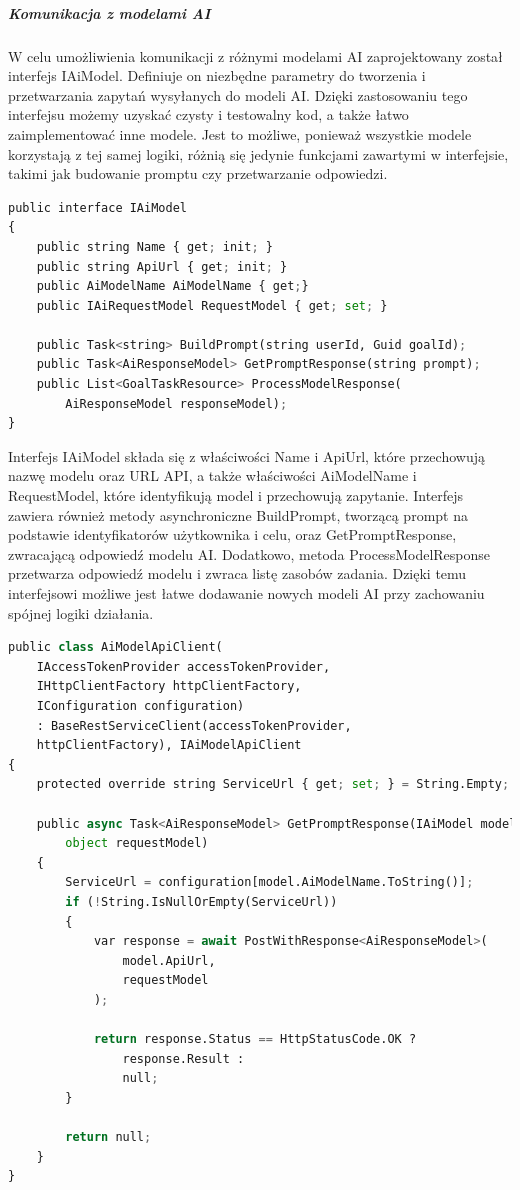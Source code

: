 \subparagraph{Komunikacja z modelami AI}
W celu umożliwienia komunikacji z różnymi modelami AI zaprojektowany został interfejs IAiModel. Definiuje on niezbędne parametry do tworzenia i przetwarzania zapytań wysyłanych do modeli AI. Dzięki zastosowaniu tego interfejsu możemy uzyskać czysty i testowalny kod, a także łatwo zaimplementować inne modele. Jest to możliwe, ponieważ wszystkie modele korzystają z tej samej logiki, różnią się jedynie funkcjami zawartymi w interfejsie, takimi jak budowanie promptu czy przetwarzanie odpowiedzi.
\begin{lstlisting}[language=Python, caption=Inerfejs IAiModel, linewidth=160mm]
public interface IAiModel
{
    public string Name { get; init; }
    public string ApiUrl { get; init; }
    public AiModelName AiModelName { get;}
    public IAiRequestModel RequestModel { get; set; }

    public Task<string> BuildPrompt(string userId, Guid goalId);
    public Task<AiResponseModel> GetPromptResponse(string prompt);
    public List<GoalTaskResource> ProcessModelResponse(
        AiResponseModel responseModel);
}
\end{lstlisting}
Interfejs IAiModel składa się z właściwości Name i ApiUrl, które przechowują nazwę modelu oraz URL API, a także właściwości AiModelName i RequestModel, które identyfikują model i przechowują zapytanie. Interfejs zawiera również metody asynchroniczne BuildPrompt, tworzącą prompt na podstawie identyfikatorów użytkownika i celu, oraz GetPromptResponse, zwracającą odpowiedź modelu AI. Dodatkowo, metoda ProcessModelResponse przetwarza odpowiedź modelu i zwraca listę zasobów zadania. Dzięki temu interfejsowi możliwe jest łatwe dodawanie nowych modeli AI przy zachowaniu spójnej logiki działania.
\begin{lstlisting}[language=Python, caption=Komunikacja z modelem AI przy użyciu klienta RESTowego, linewidth=160mm]
public class AiModelApiClient(
    IAccessTokenProvider accessTokenProvider,
    IHttpClientFactory httpClientFactory,
    IConfiguration configuration)
    : BaseRestServiceClient(accessTokenProvider, 
    httpClientFactory), IAiModelApiClient
{
    protected override string ServiceUrl { get; set; } = String.Empty;

    public async Task<AiResponseModel> GetPromptResponse(IAiModel model, 
        object requestModel)
    {
        ServiceUrl = configuration[model.AiModelName.ToString()];
        if (!String.IsNullOrEmpty(ServiceUrl))
        {
            var response = await PostWithResponse<AiResponseModel>(
                model.ApiUrl, 
                requestModel
            );

            return response.Status == HttpStatusCode.OK ? 
                response.Result : 
                null;
        }

        return null;
    }
}
\end{lstlisting}
